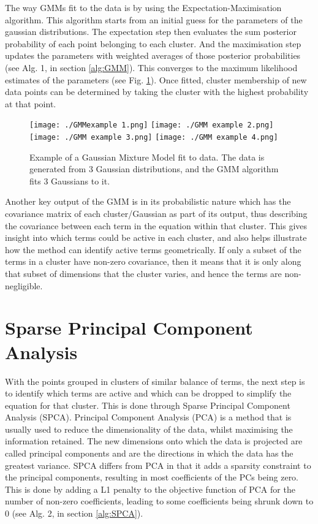 \documentclass[12pt]{report} %
\begin{document}
\vspace{5mm}

The way GMMs fit to the data is by using the Expectation-Maximisation algorithm. This algorithm starts from an initial guess for the parameters of the gaussian distributions. The expectation step then evaluates the sum posterior probability of each point belonging to each cluster. And the maximisation step updates the parameters with weighted averages of those posterior probabilities\cite{dempster1977maximum} (see Alg. 1, in section \ref{alg:GMM}). This converges to the maximum likelihood estimates of the parameters (see Fig. \ref{fig:GMM_example}). Once fitted, cluster membership of new data points can be determined by taking the cluster with the highest probability at that point.

\begin{figure}[htbp]
  \centering
  \texttt{[image: ./GMMexample 1.png]}
  \texttt{[image: ./GMM example 2.png]}
  \texttt{[image: ./GMM example 3.png]}
  \texttt{[image: ./GMM example 4.png]}
  \caption{Example of a Gaussian Mixture Model fit to data. The data is generated from 3 Gaussian distributions, and the GMM algorithm fits 3 Gaussians to it. \cite[1D Example Notebook]{gmm_towardsdatascience}}
  \label{fig:GMM_example}
\end{figure}

Another key output of the GMM is in its probabilistic nature which has the covariance matrix of each cluster/Gaussian as part of its output, thus describing the covariance between each term in the equation within that cluster. This gives insight into which terms could be active in each cluster, and also helps illustrate how the method can identify active terms geometrically. If only a subset of the terms in a cluster have non-zero covariance, then it means that it is only along that subset of dimensions that the cluster varies, and hence the terms are non-negligible.

\section{Sparse Principal Component Analysis}

With the points grouped in clusters of similar balance of terms, the next step is to identify which terms are active and which can be dropped to simplify the equation for that cluster. This is done through Sparse Principal Component Analysis (SPCA). Principal Component Analysis (PCA) is a method that is usually used to reduce the dimensionality of the data, whilst maximising the information retained. The new dimensions onto which the data is projected are called principal components and are the directions in which the data has the greatest variance\cite{lever2017principal}. SPCA differs from PCA in that it adds a sparsity constraint to the principal components, resulting in most coefficients of the PCs being zero. This is done by adding a L1 penalty to the objective function of PCA for the number of non-zero coefficients, leading to some coefficients being shrunk down to 0\cite{zou2006sparse} (see Alg. 2, in section \ref{alg:SPCA}).
\end{document}
